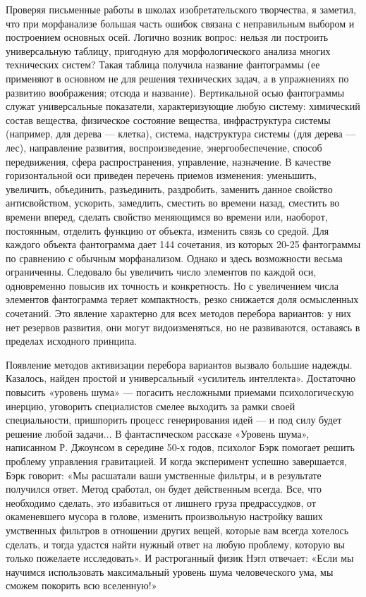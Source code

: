 Проверяя  письменные  работы  в школах  изобретательского  творчества,
я  заметил,  что  при  морфанализе  большая  часть  ошибок  связана  с
неправильным  выбором  и  построением основных  осей.  Логично  возник
вопрос:  нельзя  ли  построить универсальную  таблицу,  пригодную  для
морфологического  анализа  многих  технических систем?  Такая  таблица
получила название фантограммы (ее применяют  в основном не для решения
технических  задач, а  в упражнениях  по развитию  воображения; отсюда
и  название).  Вертикальной   осью  фантограммы  служат  универсальные
показатели, характеризующие любую систему: химический состав вещества,
физическое  состояние  вещества,   инфраструктура  системы  (например,
для  дерева  —  клетка),  система, надструктура  системы  (для  дерева
—  лес),  направление  развития,  воспроизведение,  энергообеспечение,
способ передвижения, сфера  распространения, управление, назначение. В
качестве  горизонтальной  оси  приведен  перечень  приемов  изменения:
уменьшить,  увеличить, объединить,  разъединить, раздробить,  заменить
данное  свойство  антисвойством,   ускорить,  замедлить,  сместить  во
времени назад, сместить во времени вперед, сделать свойство меняющимся
во  времени или,  наоборот, постоянным,  отделить функцию  от объекта,
изменить связь  со средой.  Для каждого  объекта фантограмма  дает 144
сочетания, из  которых 20-25%
фантограммы  по  сравнению  с  обычным морфанализом.  Однако  и  здесь
возможности весьма ограниченны. Следовало бы увеличить число элементов
по каждой оси,  одновременно повысив их точность и  конкретность. Но с
увеличением  числа элементов  фантограмма  теряет компактность,  резко
снижается доля осмысленных сочетаний.  Это явление характерно для всех
методов перебора  вариантов: у  них нет  резервов развития,  они могут
видоизменяться,  но не  развиваются,  оставаясь  в пределах  исходного
принципа.


Появление  методов  активизации  перебора  вариантов  вызвало  большие
надежды.   Казалось,  найден   простой   и  универсальный   «усилитель
интеллекта».   Достаточно   повысить   «уровень   шума»   —   погасить
несложными  приемами психологическую  инерцию, уговорить  специалистов
смелее  выходить  за  рамки своей  специальности,  пришпорить  процесс
генерирования  идей  —  и  под  силу  будет  решение  любой  задачи...
В  фантастическом  рассказе  «Уровень шума»,  написанном  Р.  Джоунсом
в  середине  50-х  годов,   психолог  Бэрк  помогает  решить  проблему
управления гравитацией. И когда  эксперимент успешно завершается, Бэрк
говорит:  «Мы  расшатали  ваши  умственные  фильтры,  и  в  результате
получился ответ. Метод сработал, он будет действенным всегда. Все, что
необходимо сделать, это избавиться  от лишнего груза предрассудков, от
окаменевшего мусора  в голове,  изменить произвольную  настройку ваших
умственных  фильтров  в отношении  других  вещей,  которые вам  всегда
хотелось  сделать,  и  тогда  удастся  найти  нужный  ответ  на  любую
проблему,  которую вы  только пожелаете  исследовать». И  растроганный
физик  Нэгл  отвечает:  «Если мы  научимся  использовать  максимальный
уровень шума человеческого ума, мы сможем покорить всю вселенную!»

